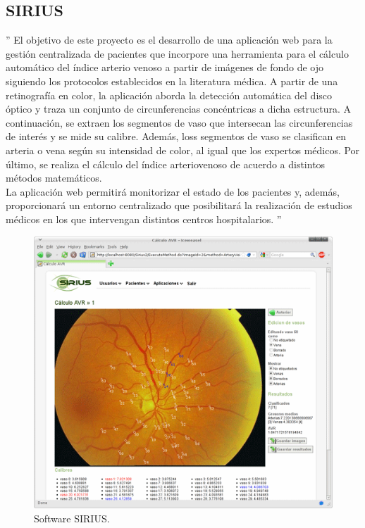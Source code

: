 \documentclass[14pt]{article}
\begin{document}
\newpage

\subsection{SIRIUS}

'' El objetivo de este proyecto es el desarrollo de una aplicación web para la gestión centralizada de pacientes que incorpore una herramienta para el cálculo automático del índice arterio venoso a partir de imágenes de fondo de ojo siguiendo los protocolos establecidos en la literatura médica. A partir de una retinografía en color, la aplicación aborda la detección automática del disco óptico y traza un conjunto de circunferencias concéntricas a dicha estructura. A continuación, se extraen los segmentos de vaso que intersecan las circunferencias de interés y se mide su calibre. Además, loss segmentos de vaso se clasifican en arteria o vena según su intensidad de color, al igual que los expertos médicos. Por último, se realiza el cálculo del índice arteriovenoso de acuerdo a distintos métodos matemáticos.\\

La aplicación web permitirá monitorizar el estado de los pacientes y, además, proporcionará un entorno centralizado que posibilitará la realización de estudios médicos en los que intervengan distintos centros hospitalarios.   '' \cite{Sirius}

\begin{figure}[h]
	\begin{center}
		\includegraphics[scale=.5]{./Imagenes/SIRIUS2.png}
		\caption{Software SIRIUS.}
	\end{center}
\end{figure} 
\end{document}
